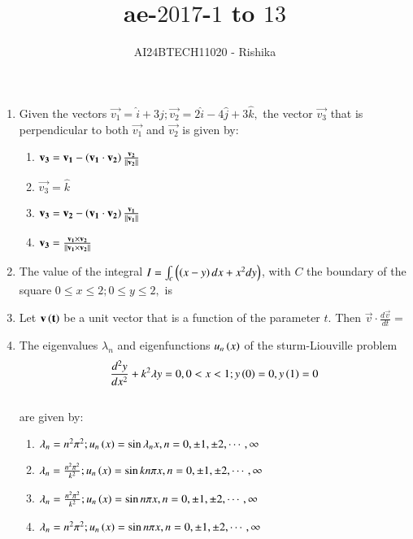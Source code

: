 \documentclass[journal,12pt,onecolumn]{IEEEtran}
\theoremstyle{remark}
\begin{document}

\vspace{3cm}

\title{ae-$2017$-$1$ to $13$}
\author{AI24BTECH11020 - Rishika}
\maketitle
\bigskip
\renewcommand{\thefigure}{\theenumi}
\renewcommand{\thetable}{\theenumi}
\begin{enumerate}[start=1]
\item Given the vectors $\vec{v_1}=\hat{i}+3\hat{j};\vec{v_2}=2\hat{i}-4\hat{j}+3\hat{k},$ the vector $\vec{v_3}$ that is perpendicular to both $\vec{v_1}$ and $\vec{v_2}$ is given by:
		\begin{enumerate}
	\item $\mathbf{v_3}=\mathbf{v_1}-\left(\mathbf{v_1}\cdot\mathbf{v_2}\right)\frac{\mathbf{v_2}}{\left\lVert\mathbf{v_2}\right\rVert}$
	\item $\vec{v_3}=\hat{k}$
	\item $\mathbf{v_3}=\mathbf{v_2}-\left(\mathbf{v_1}\cdot\mathbf{v_2}\right)\frac{\mathbf{v_1}}{\left\lVert\mathbf{v_1}\right\rVert}$
	\item $\mathbf{v_3}=\frac{\mathbf{v_1}\times\mathbf{v_2}}{\left\lVert\mathbf{v_1}\times\mathbf{v_2}\right\rVert}$
		\end{enumerate}
\item The value of the integral $I=\int_c\left(\left(x-y\right)dx+x^2dy\right)$, with $C$ the boundary of the square $0\leq x\leq 2;0\leq y\leq 2,$ is \underline{\hspace{2cm}}

\item Let $\mathbf{v\left(t\right)}$ be a unit vector that is a function of the parameter $t$. Then $\vec{v}\cdot\frac{d\vec{v}}{dt}=$ \underline{\hspace{2cm}}

\item The eigenvalues $\lambda_n$ and eigenfunctions $u_n\left(x\right)$ of the sturm-Liouville problem $$\frac{d^2y}{dx^2}+k^2\lambda y=0, 0<x<1; y\left(0\right)=0,y\left(1\right)=0$$\\
		are given by:
 \begin{enumerate}
	 \item $\lambda_n=n^2\pi^2;u_n\left(x\right)=\sin\lambda_nx,   n=0,\pm1,\pm2,\cdots,\infty$
	 \item $\lambda_n=\frac{n^2\pi^2}{k^2};u_n\left(x\right)=\sin kn\pi x,   n=0,\pm1,\pm2,\cdots,\infty$
	 \item $\lambda_n=\frac{n^2\pi^2}{k^2};u_n\left(x\right)=\sin n\pi x,   n=0,\pm1,\pm2,\cdots,\infty$
	 \item $\lambda_n=n^2\pi^2;u_n\left(x\right)=\sin n\pi x,   n=0,\pm1,\pm2,\cdots,\infty$
 \end{enumerate}


\end{enumerate}
\end{document}
